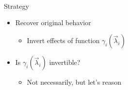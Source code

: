 \documentclass[aspectratio=169]{beamer}
\begin{document}
\begin{frame}{Strategy}
  \begin{itemize}
    \item<1-> Recover original behavior
          \begin{itemize}
            \item<2-> Invert effects of function $\gamma_{i}(\vec{\lambda}_{i})$
          \end{itemize}
  \end{itemize}

  \begin{itemize}
    \item<3-> Is $\gamma_{i}(\vec{\lambda}_{i})$ invertible?
          \begin{itemize}
            \item<4-> Not necessarily, but let's reason
          \end{itemize}
          \centering
  \end{itemize}

\end{frame}
\end{document}
